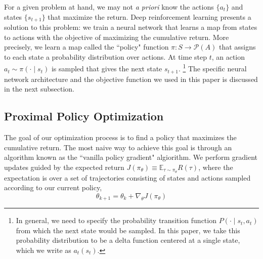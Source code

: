 For a given problem at hand, we may not \textit{a priori} know the actions $\{a_t\}$ and states $\{s_{t+1}\}$ that maximize the return. Deep reinforcement learning presents a solution to this problem: we train a neural network that learns a map from states to actions with the objective of maximizing the cumulative return. More precisely, we learn a map called the ``policy" function $\pi : S \to \mathcal{P}(A)$ that assigns to each state a probability distribution over actions. At time step $t$, an action $a_t \sim \pi(\cdot \mid s_t)$ is sampled that gives the next state $s_{t+1}$.
\footnote{In general, we need to specify the probability transition function $P(\cdot \mid s_t, a_t)$  from which the next state would be sampled. In this paper, we take this probability distribution to be a delta function centered at a single state, which we write as $a_t(s_t)$.}
The specific neural network architecture and the objective function we used in this paper is discussed in the next subsection.
\newline

\subsection{Proximal Policy Optimization} \label{sec:ppo}

The goal of our optimization process is to find a policy that maximizes the cumulative return. The most naive way to achieve this goal is through an algorithm known as the ``vanilla policy gradient" algiorithm. We perform gradient updates guided by the expected return $J(\pi_\theta) \equiv \mathbb{E}_{\tau \sim \pi_\theta} R(\tau)$, where the expectation is over a set of trajectories consisting of states and actions sampled according to our current policy,
\[
\theta_{k+1} = \theta_k + \nabla_\theta J(\pi_\theta)
\]

